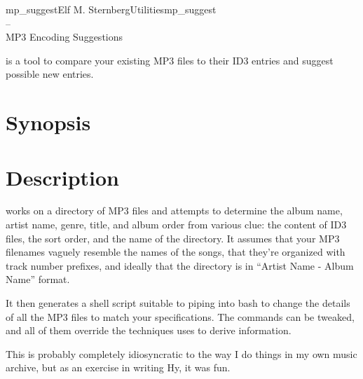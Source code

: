 \documentclass[english]{article}
\begin{document}
\begin{Name}{1}{mp\_suggest}{Elf M. Sternberg}{Utilities}{mp\_suggest \\--\\ MP3 Encoding Suggestions}

   is a tool to compare your existing MP3 files to
  their ID3 entries and suggest possible new entries.

\end{Name}

\section{Synopsis}

 

\section{Description}

 works on a directory of MP3 files and attempts to
determine the album name, artist name, genre, title, and album order
from various clue: the content of ID3 files, the sort order, and the
name of the directory.  It assumes that your MP3 filenames vaguely
resemble the names of the songs, that they're organized with track
number prefixes, and ideally that the directory is in ``Artist Name -
Album Name'' format.

It then generates a shell script suitable to piping into bash to change
the details of all the MP3 files to match your specifications.  The
commands can be tweaked, and all of them override the techniques
 uses to derive information.

This is probably completely idiosyncratic to the way I do things in my
own music archive, but as an exercise in writing Hy, it was fun.
\end{document}

